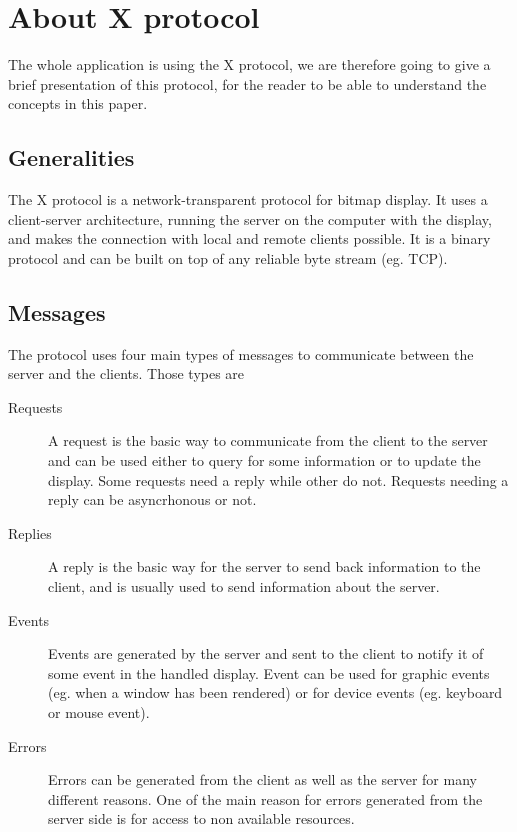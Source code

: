 \section{About X protocol}
The whole application is using the X protocol, we are therefore going
to give a brief presentation of this protocol, for the reader to be able 
to understand the concepts in this paper.
\subsection{Generalities}
The X protocol is a network-transparent protocol for bitmap display. 
It uses a client-server architecture, running the server on the computer 
with the display, and makes the connection with local and remote clients possible. 
It is a binary protocol and can be built on top of any reliable byte stream (eg. TCP).
\subsection{Messages}
The protocol uses four main types of messages to communicate between 
the server and the clients. Those types are
\begin{description}
\item[Requests] A request is the basic way to communicate from the client 
  to the server and can be used either to query for some information or to 
  update the display. Some requests need a reply while other do not. 
  Requests needing a reply can be asyncrhonous or not.
\item[Replies] A reply is the basic way for the server to send back
  information to the client, and is usually used to send information about the server.
\item[Events] Events are generated by the server and sent to the client to notify it of 
  some event in the handled display. Event can be used for graphic events 
  (eg. when a window has been rendered) or for device events (eg. keyboard or mouse event).
\item[Errors] Errors can be generated from the client as well as the server
  for many different reasons. One of the main reason for errors generated 
  from the server side is for access to non available resources.
\end{description}
